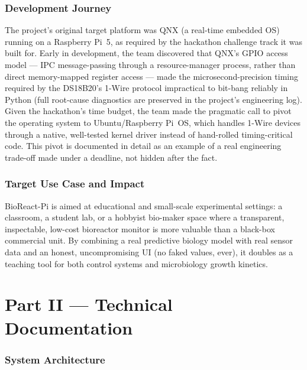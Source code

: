 \documentclass[11pt]{article}
\begin{document}
\section{Development Journey}

The project's original target platform was QNX (a real-time embedded OS) running on a Raspberry Pi~5, as required by the hackathon challenge track it was built for. Early in development, the team discovered that QNX's GPIO access model --- IPC message-passing through a resource-manager process, rather than direct memory-mapped register access --- made the microsecond-precision timing required by the DS18B20's 1-Wire protocol impractical to bit-bang reliably in Python (full root-cause diagnostics are preserved in the project's engineering log). Given the hackathon's time budget, the team made the pragmatic call to pivot the operating system to Ubuntu/Raspberry Pi~OS, which handles 1-Wire devices through a native, well-tested kernel driver instead of hand-rolled timing-critical code. This pivot is documented in detail as an example of a real engineering trade-off made under a deadline, not hidden after the fact.

\section{Target Use Case and Impact}

BioReact-Pi is aimed at educational and small-scale experimental settings: a classroom, a student lab, or a hobbyist bio-maker space where a transparent, inspectable, low-cost bioreactor monitor is more valuable than a black-box commercial unit. By combining a real predictive biology model with real sensor data and an honest, uncompromising UI (no faked values, ever), it doubles as a teaching tool for both control systems and microbiology growth kinetics.

\newpage
\part*{Part II --- Technical Documentation}

\section{System Architecture}
\end{document}
